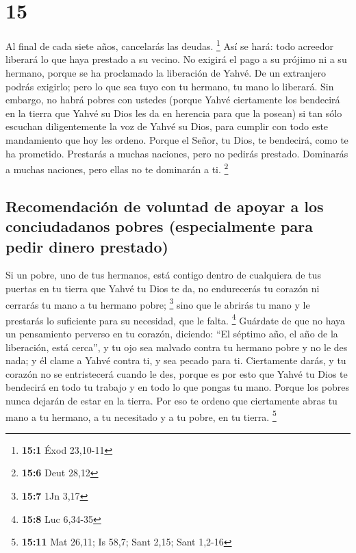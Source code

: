 \hypertarget{section-14}{%
\section{15}\label{section-14}}

 Al final de cada siete años, cancelarás las deudas.
\footnote{\textbf{15:1} Éxod 23,10-11}  Así se hará: todo
acreedor liberará lo que haya prestado a su vecino. No exigirá el pago a
su prójimo ni a su hermano, porque se ha proclamado la liberación de
Yahvé.  De un extranjero podrás exigirlo; pero lo que sea
tuyo con tu hermano, tu mano lo liberará.  Sin embargo, no
habrá pobres con ustedes (porque Yahvé ciertamente los bendecirá en la
tierra que Yahvé su Dios les da en herencia para que la posean)
 si tan sólo escuchan diligentemente la voz de Yahvé su
Dios, para cumplir con todo este mandamiento que hoy les ordeno.
 Porque el Señor, tu Dios, te bendecirá, como te ha
prometido. Prestarás a muchas naciones, pero no pedirás prestado.
Dominarás a muchas naciones, pero ellas no te dominarán a ti.
\footnote{\textbf{15:6} Deut 28,12}

\hypertarget{recomendaciuxf3n-de-voluntad-de-apoyar-a-los-conciudadanos-pobres-especialmente-para-pedir-dinero-prestado}{%
\subsection{Recomendación de voluntad de apoyar a los conciudadanos
pobres (especialmente para pedir dinero
prestado)}\label{recomendaciuxf3n-de-voluntad-de-apoyar-a-los-conciudadanos-pobres-especialmente-para-pedir-dinero-prestado}}

 Si un pobre, uno de tus hermanos, está contigo dentro de
cualquiera de tus puertas en tu tierra que Yahvé tu Dios te da, no
endurecerás tu corazón ni cerrarás tu mano a tu hermano pobre;
\footnote{\textbf{15:7} 1Jn 3,17}  sino que le abrirás tu
mano y le prestarás lo suficiente para su necesidad, que le falta.
\footnote{\textbf{15:8} Luc 6,34-35}  Guárdate de que no
haya un pensamiento perverso en tu corazón, diciendo: ``El séptimo año,
el año de la liberación, está cerca'', y tu ojo sea malvado contra tu
hermano pobre y no le des nada; y él clame a Yahvé contra ti, y sea
pecado para ti.  Ciertamente darás, y tu corazón no se
entristecerá cuando le des, porque es por esto que Yahvé tu Dios te
bendecirá en todo tu trabajo y en todo lo que pongas tu mano.
 Porque los pobres nunca dejarán de estar en la tierra.
Por eso te ordeno que ciertamente abras tu mano a tu hermano, a tu
necesitado y a tu pobre, en tu tierra. \footnote{\textbf{15:11} Mat
  26,11; Is 58,7; Sant 2,15; Sant 1,2-16}

